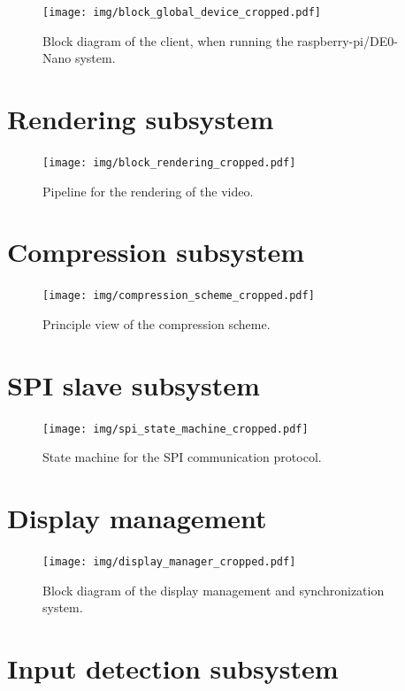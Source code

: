 \documentclass[english, DIV=13]{scrreprt}
\begin{document}
\begin{figure}
    \centering
    \texttt{[image: img/block\_global\_device\_cropped.pdf]}
    \caption{Block diagram of the client, when running the raspberry-pi/DE0-Nano system.}
    \label{fig:global-device}
\end{figure}

\chapter{Rendering subsystem}

\begin{figure}
    \centering
    \texttt{[image: img/block\_rendering\_cropped.pdf]}
    \caption{Pipeline for the rendering of the video.}
\end{figure}

\chapter{Compression subsystem}

\begin{figure}
    \centering
    \texttt{[image: img/compression\_scheme\_cropped.pdf]}
    \caption{Principle view of the compression scheme.}
\end{figure}

\chapter{SPI slave subsystem}

\begin{figure}
    \centering
    \texttt{[image: img/spi\_state\_machine\_cropped.pdf]}
    \caption{State machine for the SPI communication protocol.}
\end{figure}

\chapter{Display management}

\begin{figure}
    \centering
    \texttt{[image: img/display\_manager\_cropped.pdf]}
    \caption{Block diagram of the display management and synchronization system.}
\end{figure}

\chapter{Input detection subsystem}
\end{document}
